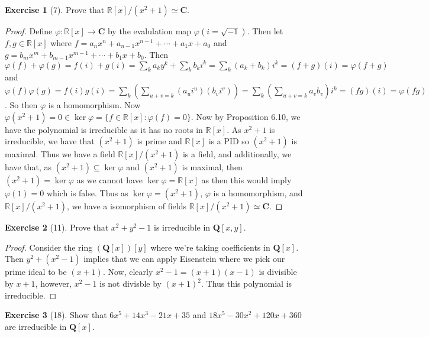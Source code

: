 \documentclass[9pt,reqno]{amsart}
\theoremstyle{definition}
\newtheorem{exercise}{Exercise}[section]
\newcommand{\rr}{\mathbb R}
\newcommand{\cc}{\mathbf C}
\newcommand{\qq}{\mathbf Q}
\begin{document}
\begin{exercise}[7] Prove that $ \rr [x] / (x^2+1) \simeq \cc$.
\end{exercise}
\begin{proof}
	Define $\varphi \colon \rr[x] \to \cc$ by the evalulation map $\varphi (i = \sqrt{-1})$. Then let $f, g \in \rr[x]$ where $f = a_n x^n + a_{n-1}x^{n-1} + \cdots + a_1 x + a_0$ and $g = b_mx^m + b_{m-1} x^{m-1} + \cdots + b_1 x+ b_0$. Then $\varphi (f) + \varphi (g) = f (i) + g(i) = \sum_k a_k y^k + \sum_k b_k i^k = \sum_k (a_k + b_k) i^k = (f+g)(i) = \varphi (f+g)$ and $\varphi (f) \varphi (g) = f(i) g(i) = \sum_k (\sum_{u+v= k} (a_u i^u) (b_v i^v)) = \sum_k (\sum_{u+v = k} a_v b_v) i^k = (fg)(i) = \varphi (fg)$. So then $\varphi$ is a homomorphism.  Now $\varphi (x^2 + 1) = 0 \in \ker \varphi = \{ f \in \rr[x] \colon \varphi (f) = 0 \}$. Now by Proposition 6.10, we have the polynomial is irreducible as it has no roots in $\rr[x]$. As $x^2+1$ is irreducible, we have that $(x^2+1)$ is prime and $\rr[x]$ is a PID so $(x^2+1)$ is maximal. Thus we have a field $\rr[x] /(x^2+1)$ is a field, and additionally, we have that, as $(x^2+1) \subseteq \ker \varphi$ and $(x^2+1)$ is maximal, then $(x^2+1) = \ker \varphi$ as we cannot have $\ker \varphi = \rr[x]$ as then this would imply $\varphi (1) = 0$ which is false. Thus as $\ker \varphi = (x^2+1)$, $\varphi $ is a homomorphism, and $\rr[x]/(x^2+1)$, we have a isomorphism of fields  $\rr[x] /(x^2+1) \simeq \cc$. 
\end{proof}
\begin{exercise}[11] Prove that $x^2 + y^2 -1$ is irreducible in $\qq[x, y]$.
\end{exercise}
\begin{proof}
	Consider the ring $(\qq[x])[y]$ where we're taking coefficients in $\qq[x]$. Then $y^2 + (x^2-1)$ implies that we can apply Eisenstein where we pick our prime ideal to be $(x+1)$. Now, clearly $x^2-1 = (x+1)(x-1)$ is divisible by $x+1$, however, $x^2-1$ is not divisble by $(x+1)^2$. Thus this polynomial is irreducible. 
\end{proof}
\begin{exercise}[18] Show that $6x^5 + 14x^3-21x+35$ and $18x^5 -30x^2 +120x+360$ are irreducible in $\qq [x]$.
\end{exercise}
\end{document}
